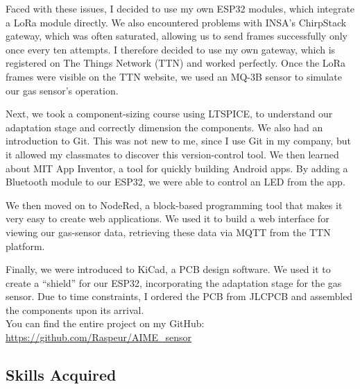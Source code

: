 Faced with these issues, I decided to use my own ESP32 modules, which integrate a LoRa module directly. We also encountered problems with INSA's ChirpStack gateway, which was often saturated, allowing us to send frames successfully only once every ten attempts. I therefore decided to use my own gateway, which is registered on The Things Network (TTN) and worked perfectly. Once the LoRa frames were visible on the TTN website, we used an MQ-3B sensor to simulate our gas sensor's operation.
\vspace{0.25cm}

Next, we took a component-sizing course using LTSPICE, to understand our adaptation stage and correctly dimension the components.
We also had an introduction to Git. This was not new to me, since I use Git in my company, but it allowed my classmates to discover this version-control tool.
We then learned about MIT App Inventor, a tool for quickly building Android apps. By adding a Bluetooth module to our ESP32, we were able to control an LED from the app.
\vspace{0.25cm}

We then moved on to NodeRed, a block-based programming tool that makes it very easy to create web applications. We used it to build a web interface for viewing our gas-sensor data, retrieving these data via MQTT from the TTN platform.
\vspace{0.25cm}

Finally, we were introduced to KiCad, a PCB design software. We used it to create a “shield” for our ESP32, incorporating the adaptation stage for the gas sensor. Due to time constraints, I ordered the PCB from JLCPCB and assembled the components upon its arrival. \\
You can find the entire project on my GitHub: \url{https://github.com/Raspeur/AIME_sensor}

\subsection{Skills Acquired}

